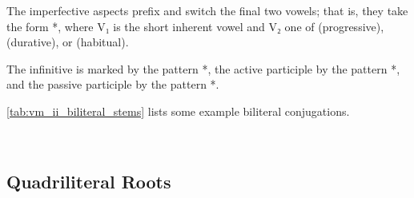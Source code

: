 \documentclass[grammar]{subfiles}
\begin{document}
The imperfective aspects prefix  and switch the final two vowels; that
is, they take the form *, where V₁ is the short inherent vowel
and V₂ one of  (progressive),  (durative), or  (habitual).

The infinitive is marked by the pattern *, the active participle
by the pattern *, and the passive participle by the pattern
*.  

\cref{tab:vm_ii_biliteral_stems} lists some example biliteral conjugations. 

\begin{table}[h!]\small\capstart
  \centering
  \\
  \caption{Pattern II biliteral stems \label{tab:vm_ii_biliteral_stems}}
\end{table}


\subsection{Quadriliteral Roots}
\label{ssec:vm_ii_quadriliteral}
\end{document}
